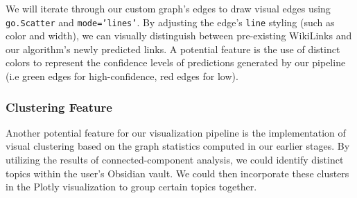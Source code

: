 \documentclass[fontsize=11pt]{article}
\begin{document}
\noindent We will iterate through our custom graph's edges to draw visual edges using \texttt{go.Scatter} and \texttt{mode='lines'}. By adjusting the edge's \texttt{line} styling (such as color and width), we can visually distinguish between pre-existing WikiLinks and our algorithm's newly predicted links. A potential feature is the use of distinct colors to represent the confidence levels of predictions generated by our pipeline (i.e green edges for high-confidence, red edges for low).

\subsubsection*{Clustering Feature}
Another potential feature for our visualization pipeline is the implementation of visual clustering based on the graph
statistics computed in our earlier stages. By utilizing the results of connected-component analysis, we could identify
distinct topics within the user’s Obsidian vault. We could then incorporate these clusters in the Plotly visualization
to group certain topics together.


\end{document}
